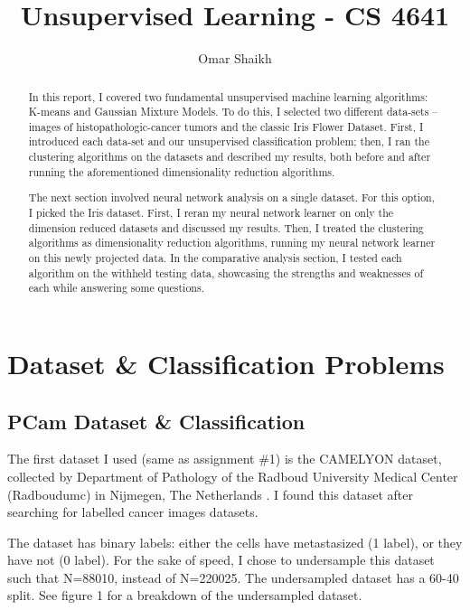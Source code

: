 \documentclass[a4paper]{article}
\begin{document}
\title{Unsupervised Learning - CS 4641}
\author{Omar Shaikh}
\maketitle

\begin{abstract}
    In this report, I covered two fundamental unsupervised machine learning algorithms: K-means and Gaussian Mixture Models. To do this, I selected two different data-sets -- images of histopathologic-cancer tumors and the classic Iris Flower Dataset. First, I introduced each data-set and our unsupervised classification problem; then, I ran the clustering algorithms on the datasets and described my results, both before and after running the aforementioned dimensionality reduction algorithms. 
    
    The next section involved neural network analysis on a single dataset. For this option, I picked the Iris dataset. First, I reran my neural network learner on only the dimension reduced datasets and discussed my results. Then, I treated the clustering algorithms as dimensionality reduction algorithms, running my neural network learner on this newly projected data. In the comparative analysis section, I tested each algorithm on the withheld testing data, showcasing the strengths and weaknesses of each while answering some questions.
\end{abstract}

\section{Dataset \& Classification Problems}
\subsection{PCam Dataset \& Classification}

The first dataset I used (same as assignment \#1) is the CAMELYON dataset, collected by Department of Pathology of the Radboud University Medical Center (Radboudumc) in Nijmegen, The Netherlands \autocite{doi:10.1093/gigascience/giy065}. I found this dataset after searching for labelled cancer images datasets.

The dataset has binary labels: either the cells have metastasized (1 label), or they have not (0 label). For the sake of speed, I chose to undersample this dataset such that N=88010, instead of N=220025. The undersampled dataset has a 60-40 split. See figure 1 for a breakdown of the undersampled dataset. 
\end{document}
